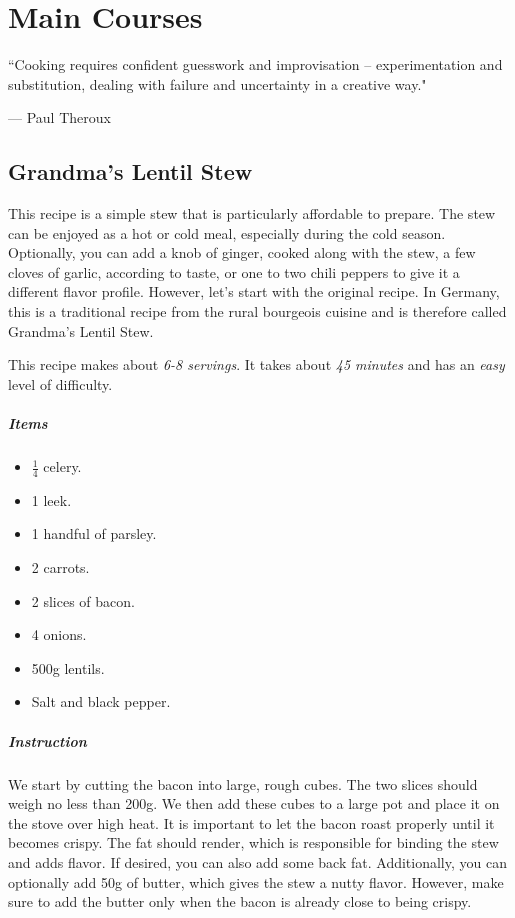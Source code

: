 \chapter{Main Courses}
\label{mains}
\epigraph{``Cooking requires confident guesswork and improvisation -- experimentation and substitution, dealing with failure and uncertainty in a creative way."}{--- \textup{Paul Theroux}}

\section{Grandma's Lentil Stew}
\label{grandmaslentilsstew}

This recipe is a simple stew that is particularly affordable to prepare. The stew can be enjoyed as a hot or cold meal, especially during the cold season. Optionally, you can add a knob of ginger, cooked along with the stew, a few cloves of garlic, according to taste, or one to two chili peppers to give it a different flavor profile. However, let's start with the original recipe. In Germany, this is a traditional recipe from the rural bourgeois cuisine and is therefore called Grandma's Lentil Stew.

This recipe makes about \emph{6-8 servings}. It takes about \emph{45 minutes} and has an \emph{easy} level of difficulty. 

\paragraph{Items}
\begin{itemize}[noitemsep]
	\item[\ding{182}] $\frac{1}{4}$ celery.
	\item[\ding{183}] 1 leek.
	\item[\ding{184}] 1 handful of parsley.
	\item[\ding{185}] 2 carrots.
	\item[\ding{186}] 2 slices of bacon.
	\item[\ding{187}] 4 onions.
	\item[\ding{188}] 500g lentils.
	\item[\ding{189}] Salt and black pepper.
\end{itemize}

\paragraph{Instruction} 
We start by cutting the bacon into large, rough cubes. The two slices should weigh no less than 200g. We then add these cubes to a large pot and place it on the stove over high heat. It is important to let the bacon roast properly until it becomes crispy. The fat should render, which is responsible for binding the stew and adds flavor. If desired, you can also add some back fat. Additionally, you can optionally add 50g of butter, which gives the stew a nutty flavor. However, make sure to add the butter only when the bacon is already close to being crispy.


